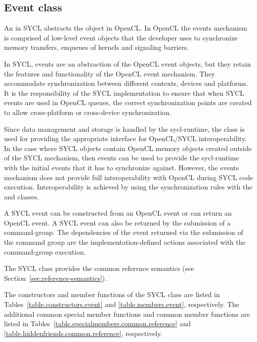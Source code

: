 \subsection{Event class}

An  in SYCL abstracts the  object in OpenCL. In
OpenCL the events mechanism is comprised of low-level event objects that
the developer uses to synchronize memory transfers,
enqueues of kernels and signaling barriers.

In SYCL, events are an abstraction of the OpenCL event objects, but they
retain the features and functionality of the OpenCL event mechanism. They
accommodate synchronization between different contexts, devices and platforms.
It is the responsibility of the SYCL implementation to ensure that when SYCL
events are used in OpenCL queues, the correct synchronization points are
created to allow cross-platform or cross-device synchronization.

Since data management and storage is handled by the \gls{sycl-runtime}, the
 class is used for providing the appropriate interface for
OpenCL/SYCL interoperability. In the case where SYCL objects contain
OpenCL memory objects created outside of the SYCL mechanism, then events
can be used to provide the \gls{sycl-runtime} with the initial events that it has
to synchronize against. However, the events mechanism does not provide
full interoperability with OpenCL during SYCL code execution.
Interoperability is achieved by using the synchronization rules with the
 and  classes.

A SYCL event can be constructed from an OpenCL event or can return an OpenCL
event.
A SYCL event can also be returned by the submission of a \gls{command-group}.
The dependencies of the event returned via the submission of the command group
are the implementation-defined actions associated with the \gls{command-group}
execution. 

The SYCL  class provides the common reference semantics
(see Section~\ref{sec:reference-semantics}).

The constructors and member functions of the SYCL  class are listed in Tables~\ref{table.constructors.event} and \ref{table.members.event}, respectively. The additional common special member functions and common member functions are listed in Tables~\ref{table.specialmembers.common.reference} and \ref{table.hiddenfriends.common.reference}, respectively.

